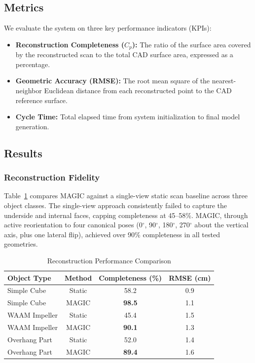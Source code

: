 \documentclass[letterpaper, 10 pt, conference]{ieeeconf}  %
\begin{document}
\subsection{Metrics}

We evaluate the system on three key performance indicators (KPIs):

\begin{itemize}
    \item \textbf{Reconstruction Completeness ($C_p$):} The ratio of the
    surface area covered by the reconstructed scan to the total CAD surface
    area, expressed as a percentage.

    \item \textbf{Geometric Accuracy (RMSE):} The root mean square of the
    nearest-neighbor Euclidean distance from each reconstructed point to the
    CAD reference surface.

    \item \textbf{Cycle Time:} Total elapsed time from system initialization
    to final model generation.
\end{itemize}

\subsection{Results}

\subsubsection{Reconstruction Fidelity}

Table~\ref{table_results} compares MAGIC against a single-view static scan
baseline across three object classes. The single-view approach consistently
failed to capture the underside and internal faces, capping completeness at
45--58\%. MAGIC, through active reorientation to four canonical poses
(0$^\circ$, 90$^\circ$, 180$^\circ$, 270$^\circ$ about the vertical axis,
plus one lateral flip), achieved over 90\% completeness in all tested
geometries.

\begin{table}[h]
\caption{Reconstruction Performance Comparison}
\label{table_results}
\begin{center}
\begin{tabular}{|l||c|c|c|}
\hline
Object Type & Method & Completeness (\%) & RMSE (cm) \\
\hline
Simple Cube     & Static & 58.2 & 0.9 \\
Simple Cube     & MAGIC  & \textbf{98.5} & 1.1 \\
\hline
WAAM Impeller   & Static & 45.4 & 1.5 \\
WAAM Impeller   & MAGIC  & \textbf{90.1} & 1.3 \\
\hline
Overhang Part   & Static & 52.0 & 1.4 \\
Overhang Part   & MAGIC  & \textbf{89.4} & 1.6 \\
\hline
\end{tabular}
\end{center}
\end{table}
\end{document}
